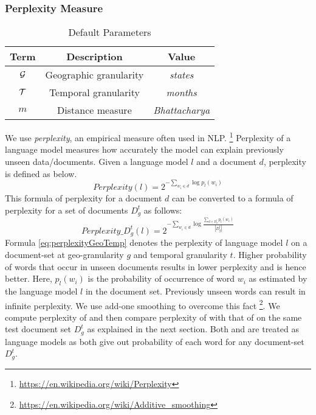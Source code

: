 \subsubsection{Perplexity Measure}
\begin{table}[t!]
\centering
\caption{Default Parameters}
\label{tab:parameters}
\begin{tabular}{|c|c|c|}
\hline
{\bf Term} &{\bf Description} & {\bf Value}\\
\hline
$\mathcal{G}$ &Geographic granularity &\emph{states}\\
\hline
$\mathcal{T}$ &Temporal granularity &\emph{months}\\
\hline
$m$ &Distance measure&\emph{Bhattacharya}\\
\hline
\end{tabular}
\end{table}
We use \emph{perplexity}, an empirical measure often used in NLP.
\footnote{\url{https://en.wikipedia.org/wiki/Perplexity}}
Perplexity of a language model measures how accurately the model can 
explain previously unseen data/documents. Given a language model
$l$ and a document $d$, perplexity is defined as below.
\begin{equation}
        \label{eq:perplexity}
	Perplexity(l) = 2^{-\sum_{w_i\in d} \log p_l(w_i)}
\end{equation}
This formula of perplexity for a document $d$ can be converted to a formula of perplexity for a set of documents $D_g^t$ as follows:
\begin{equation}
        \label{eq:perplexityGeoTemp}
	Perplexity\_{D_g^t}(l) = 2^{-\sum_{w_i\in d} \log \frac{\sum_{d\in D_g^t}p_l(w_i)}{|D_g^t|}}
\end{equation}
Formula \ref{eq:perplexityGeoTemp} denotes the perplexity of language model $l$ on a document-set at geo-granularity $g$ and temporal granularity $t$. 
Higher probability of words that occur in unseen documents results in lower perplexity and is hence better.
Here, $p_l(w_i)$ is the probability of occurrence of word $w_i$ as 
estimated by the language model $l$ in the document set. Previously unseen words can result in infinite perplexity. We use add-one smoothing to overcome this fact \footnote{\url{https://en.wikipedia.org/wiki/Additive_smoothing}}.
We compute perplexity of \tmatam and then compare perplexity of \tmatam with that of \tmlda on the same test document set  $D_g^t$ as explained in the next section. Both \tmatam and \tmlda are treated as  language models
as both give out probability of each word for any document-set $D_g^t$.

